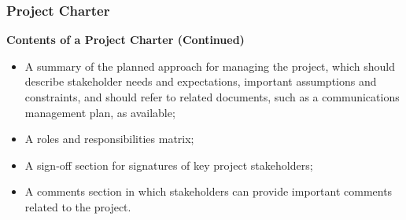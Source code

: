 \documentclass[aspectratio=169]{beamer}
\begin{document}
\begin{frame}
\frametitle{Project Charter}
\textbf{Contents of a Project Charter (Continued)}
\vspace{0.5cm}
\begin{itemize}
\item A summary of the planned approach for managing the project, which should describe stakeholder needs and expectations, important assumptions and constraints, and should refer to related documents, such as a communications management plan, as available;
\item A roles and responsibilities matrix;
\item A sign-off section for signatures of key project stakeholders;
\item A comments section in which stakeholders can provide important comments related to the project.
\end{itemize}
\end{frame}
\end{document}

